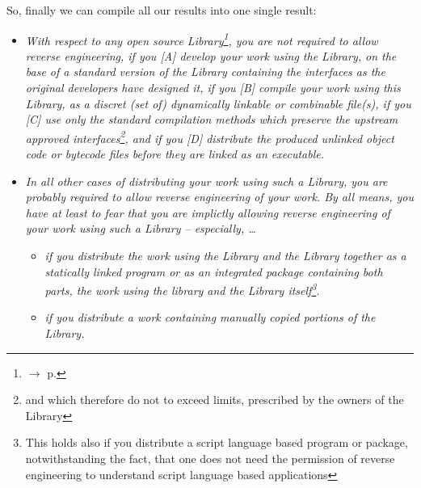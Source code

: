 %
%
%
%
%

So, finally we can compile all our results into one single result:
\begin{itemize}
  \item \emph{With respect to any open source Library\footnote{$\rightarrow$ p.
  }, you are not required to allow reverse
  engineering, if you [A] develop your work using the Library, on the base of a
  standard version of the Library containing the interfaces as the original
  developers have designed it, if you [B] compile your work using this Library,
  as a discret (set of) dynamically linkable or combinable file(s), if you [C]
  use only the standard compilation methods which preserve the upstream approved
  interfaces\footnote{and which therefore do not to exceed limits, prescribed by
  the owners of the Library}, and if you [D] distribute the produced unlinked
  object code or bytecode files before they are linked as an executable.}
  \item \emph{In all other cases of distributing your work using such a Library,
  you are probably required to allow reverse engineering of your work. By all
  means, you have at least to fear that you are implictly allowing reverse
  engineering of your work using such a Library -- especially, \ldots}
  \begin{itemize}
    \item \emph{if you distribute the work using the Library and the Library
    together as a statically linked program or as an integrated package
    containing both parts, the work using the library and the Library
    itself\footnote{This holds also if you distribute a script language based
    program or package, notwithstanding the fact, that one does not need the
    permission of reverse engineering to understand script language based
    applications}.}
    \item \emph{if you distribute a work containing manually copied portions of
    the Library.}
  \end{itemize}
\end{itemize}
 
